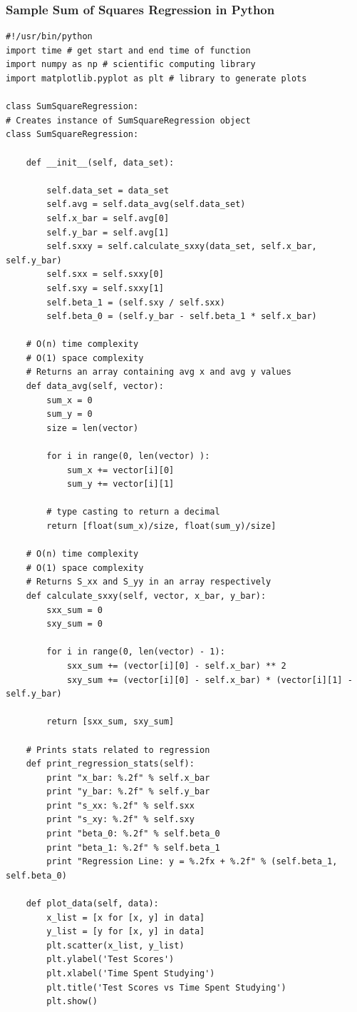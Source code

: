 \documentclass[12pt]{article}
\begin{document}
\subsubsection{Sample Sum of Squares Regression in Python}
\begin{lstlisting}
#!/usr/bin/python
import time # get start and end time of function
import numpy as np # scientific computing library
import matplotlib.pyplot as plt # library to generate plots

class SumSquareRegression:
# Creates instance of SumSquareRegression object	
class SumSquareRegression:
	
	def __init__(self, data_set):

		self.data_set = data_set
		self.avg = self.data_avg(self.data_set)
		self.x_bar = self.avg[0]
		self.y_bar = self.avg[1]
		self.sxxy = self.calculate_sxxy(data_set, self.x_bar, self.y_bar)
		self.sxx = self.sxxy[0]
		self.sxy = self.sxxy[1]
		self.beta_1 = (self.sxy / self.sxx)
		self.beta_0 = (self.y_bar - self.beta_1 * self.x_bar)

	# O(n) time complexity
	# O(1) space complexity
	# Returns an array containing avg x and avg y values
	def data_avg(self, vector):
		sum_x = 0
		sum_y = 0
		size = len(vector) 

		for i in range(0, len(vector) ):
			sum_x += vector[i][0]
			sum_y += vector[i][1]

		# type casting to return a decimal
		return [float(sum_x)/size, float(sum_y)/size]

	# O(n) time complexity
	# O(1) space complexity
	# Returns S_xx and S_yy in an array respectively
	def calculate_sxxy(self, vector, x_bar, y_bar):
		sxx_sum = 0
		sxy_sum = 0

		for i in range(0, len(vector) - 1):
			sxx_sum += (vector[i][0] - self.x_bar) ** 2
			sxy_sum += (vector[i][0] - self.x_bar) * (vector[i][1] - self.y_bar)

		return [sxx_sum, sxy_sum]

	# Prints stats related to regression
	def print_regression_stats(self):
		print "x_bar: %.2f" % self.x_bar
		print "y_bar: %.2f" % self.y_bar
		print "s_xx: %.2f" % self.sxx
		print "s_xy: %.2f" % self.sxy
		print "beta_0: %.2f" % self.beta_0
		print "beta_1: %.2f" % self.beta_1
		print "Regression Line: y = %.2fx + %.2f" % (self.beta_1, self.beta_0)

	def plot_data(self, data):
		x_list = [x for [x, y] in data]
		y_list = [y for [x, y] in data]
		plt.scatter(x_list, y_list)
		plt.ylabel('Test Scores')
		plt.xlabel('Time Spent Studying')
		plt.title('Test Scores vs Time Spent Studying')
		plt.show()


\end{lstlisting}
\end{document}
